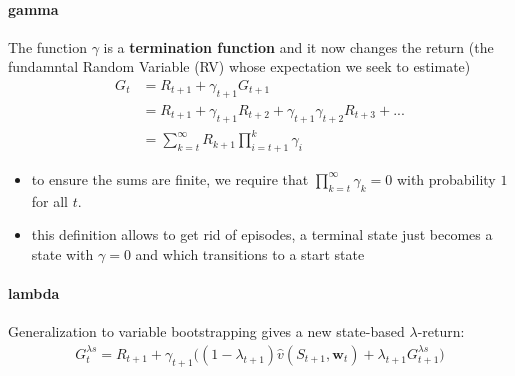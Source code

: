 \documentclass[sutton_barto_notes.tex]{subfiles}
\begin{document}
\paragraph{gamma}
 The function $\gamma$ is a \textbf{termination function} and it now changes the return (the fundamntal Random Variable (RV) whose expectation we seek to estimate) 
\begin{align*}
G_t & = R_{t+1} + \gamma_{t+1} G_{t+1}\\
 & = R_{t+1} + \gamma_{t+1} R_{t+2} + \gamma_{t+1} \gamma_{t+2} R_{t+3} + ...\\
 & = \sum_{k=t}^{\infty} R_{k+1} \prod_{i=t+1}^k \gamma_i \label{eq:12.17}\tag{12.17}
\end{align*} 
\begin{itemize}
\item to ensure the sums are finite, we require that $\prod_{k=t}^{\infty} \gamma_k = 0$ with probability $1$ for all $t$. 
\item this definition allows to get rid of episodes, a terminal state just becomes a state with $\gamma = 0$ and which transitions to a start state 
\end{itemize}

\paragraph{lambda}
 Generalization to variable bootstrapping gives a new state-based $\lambda$-return: 
\begin{align}
G_t^{\lambda s} = R_{t+1} + \gamma_{t+1} \big( (1 - \lambda_{t+1}) \hat{v}(S_{t+1}, \mathbf{w}_{t}) + \lambda_{t+1} G_{t+1}^{\lambda s}\big) \label{eq:12.18}\tag{12.18}
\end{align}
\end{document}
